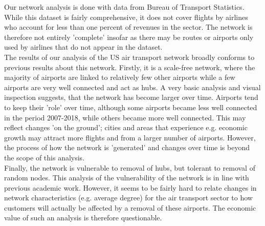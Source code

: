 \label{sec:results}
Our network analysis is done with data from Bureau of Transport Statistics. While this dataset is fairly comprehensive, it does not cover flights by airlines who account for less than one percent of revenues in the sector. The network is therefore not entirely 'complete' insofar as there may be routes or airports only used by airlines that do not appear in the dataset.\\
The results of our analysis of the US air transport network broadly conforms to previous results about this network. Firstly, it is a scale-free network, where the majority of airports are linked to relatively few other airports while a few airports are very well connected and act as hubs. A very basic analysis and visual inspection suggests, that the network has become larger over time. Airports tend to keep their 'role' over time, although some airports became less well connected in the period 2007-2018, while others became more well connected. This may reflect changes 'on the ground'; cities and areas that experience e.g. economic growth may attract more flights and from a larger number of airports. However, the process of how the network is 'generated' and changes over time is beyond the scope of this analysis. \\ 
Finally, the network is vulnerable to removal of hubs, but tolerant to removal of random nodes. This analysis of the vulnerability of the network is in line with previous academic work. However, it seems to be fairly hard to relate changes in network characteristics (e.g. average degree) for the air transport sector to how customers will actually be affected by a removal of these airports. The economic value of such an analysis is therefore questionable. \\

